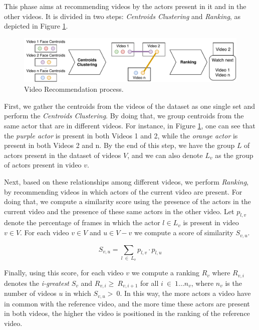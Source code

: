 This phase aims at recommending videos by the actors present in it and in the other videos.
It is divided in two steps: \emph{Centroids Clustering} and \emph{Ranking}, as depicted in Figure \ref{fig:video_recommendation}.

\begin{figure}[!ht]
  \centering
  \includegraphics[width=0.8\linewidth]{img/ism/video_recommendation.pdf}
  \caption{Video Recommendation process.}
  \label{fig:video_recommendation}
\end{figure}

First, we gather the centroids from the videos of the dataset as one single set and perform the \textit{Centroids Clustering}.
By doing that, we group centroids from the same actor that are in different videos. For instance, in Figure \ref{fig:video_recommendation}, one can see that the \emph{purple actor} is present in both Videos 1 and 2, while the \emph{orange actor} is present in both Videos 2 and n. By the end of this step, we have the group $L$ of actors present in the dataset of videos $V$, and we can also denote $L_v$ as the group of actors present in video $v$.

Next, based on these relationships among different videos, we perform \textit{Ranking}, by recommending videos in which actors of the current video are present. 
For doing that, we compute a similarity score using the presence of the actors in the current video and the presence of these same actors in the other video.
Let $p_{l,v}$ denote the percentage of frames in which the actor $l \in L_v$ is present in video $v \in V$. For each video $v \in V$ and $u \in V-v$ we compute a score of similarity $S_{v,u}$.

\vspace{-1em}
\begin{equation}
  S_{v,u} = \sum_{l~\in~L_v}{p_{l,v}\cdot{p_{l,u}}}
\end{equation}

Finally, using this score, for each video $v$ we compute a ranking $R_{v}$ where $R_{v,i}$ denotes the \emph{i-greatest} $S_v$ and $R_{v,i}\ge~R_{v,i+1}$ for all $i~\in~1...n_v$, where $n_v$ is the number of videos $u$ in which $S_{v,u}>~0$. 
In this way, the more actors a video have in common with the reference video, and the more time these actors are present in both videos, the higher the video is positioned in the ranking of the reference video.  

